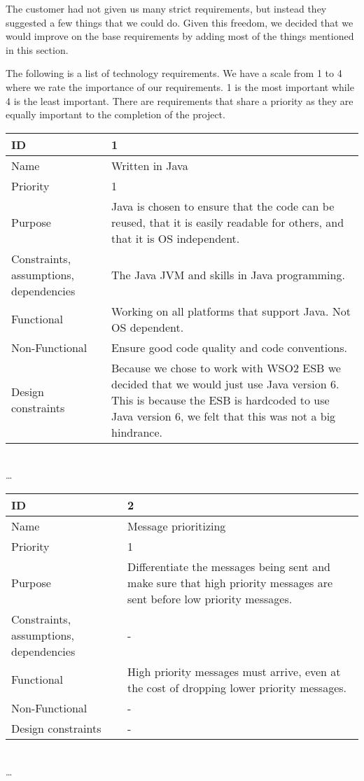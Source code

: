     The customer had not given us many strict requirements, but instead they suggested a few things that we could do. Given this freedom, we decided that we would improve on the base requirements by adding most of the things mentioned in this section. 

    The following is a list of technology requirements. We have a scale from 1 to 4 where we rate the importance of our requirements. 1 is the most important while 4 is the least important. There are requirements that share a priority as they are equally important to the completion of the project. \\
    
\begin{center}
	\begin{tabular}{| p{4cm} | p{8cm} |}
		\hline
		ID & 1 \\
		\hline
		Name & Written in Java  \\
		\hline
		Priority & 1 \\
		\hline
		Purpose & Java is chosen to ensure that the code can be reused, that it is easily readable for others, and that it is OS independent. \\
		\hline 
		Constraints, assumptions, dependencies & The Java JVM and skills in Java programming. \\
		\hline  
		Functional & Working on all platforms that support Java. Not OS dependent. \\
		\hline
		Non-Functional & Ensure good code quality and code conventions. \\ 
		\hline
		Design constraints & Because we chose to work with WSO2 ESB we decided that we would just use Java version 6. This is because the ESB is hardcoded to use Java version 6, we felt that this was not a big hindrance.  \\
		\hline
	\end{tabular}
	\\  \ldots  \\

	\begin{tabular}{| p{4cm} | p{8cm} |}
		\hline
		ID & 2 \\
		\hline
		Name & Message prioritizing \\
		\hline
		Priority & 1 \\
		\hline
		Purpose & Differentiate the messages being sent and make sure that high priority messages are sent before low priority messages. \\
		\hline 
		Constraints, assumptions, dependencies & -\\
		\hline  
		Functional & High priority messages must arrive, even at the cost of dropping lower priority messages.  \\
		\hline
		Non-Functional & - \\ 
		\hline
		Design constraints & - \\
		\hline
	\end{tabular}
	\\  \ldots  \\


\end{center}
